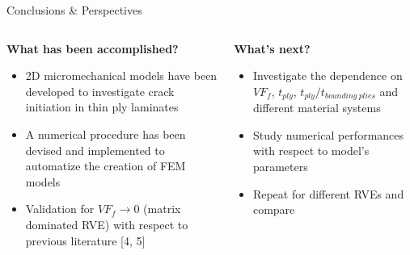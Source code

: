 \documentclass[final]{beamer}
\begin{document}
\begin{frame}
\begin{center}
	\begin{minipage}{\textwidth}
		\begin{alertblock}{\rule[-0.6ex]{0pt}{50pt}\centering\LARGE Conclusions \& Perspectives}
			\begin{columns}
				\begin{column}{0.475\textwidth}
   					 \begin{center}
						\textbf{What has been accomplished?}\\[10pt]
							\begin{itemize}
    								\item 2D micromechanical models have been developed to investigate crack initiation in thin ply laminates
								\item A numerical procedure has been devised and implemented to automatize the creation of FEM models
								\item Validation for $VF_{f}\to 0$ (matrix dominated RVE) with respect to previous literature [4, 5]
							\end{itemize}
   					\end{center}
				\end{column}
				\begin{column}{0.475\textwidth}  %
   					\begin{center}
						\textbf{What's next?}\\[10pt]
						\begin{itemize}
    							\item Investigate the dependence on $VF_{f}$, $t_{ply}$, $t_{ply}/t_{bounding\ plies}$ and different material systems
							\item Study numerical performances with respect to model's parameters
							\item Repeat for different RVEs and compare
						\end{itemize}
   					\end{center}
				\end{column}
			\end{columns}
		\end{alertblock}
	\end{minipage}
\end{center}


\newsavebox{\squaredblocktext}


\end{frame}
\end{document}

